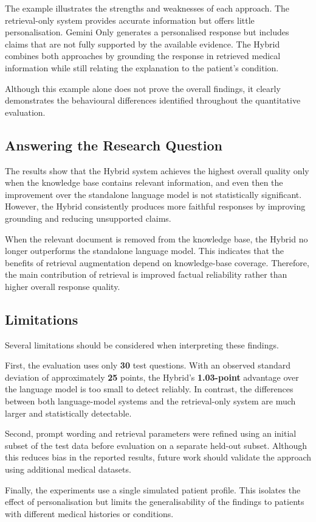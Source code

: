 The example illustrates the strengths and weaknesses of each approach. The retrieval-only system provides accurate information but offers little personalisation. Gemini Only generates a personalised response but includes claims that are not fully supported by the available evidence. The Hybrid combines both approaches by grounding the response in retrieved medical information while still relating the explanation to the patient's condition.

Although this example alone does not prove the overall findings, it clearly demonstrates the behavioural differences identified throughout the quantitative evaluation.

\subsection{Answering the Research Question}

The results show that the Hybrid system achieves the highest overall quality only when the knowledge base contains relevant information, and even then the improvement over the standalone language model is not statistically significant. However, the Hybrid consistently produces more faithful responses by improving grounding and reducing unsupported claims.

When the relevant document is removed from the knowledge base, the Hybrid no longer outperforms the standalone language model. This indicates that the benefits of retrieval augmentation depend on knowledge-base coverage. Therefore, the main contribution of retrieval is improved factual reliability rather than higher overall response quality.

\subsection{Limitations}

Several limitations should be considered when interpreting these findings.

First, the evaluation uses only \textbf{30} test questions. With an observed standard deviation of approximately \textbf{25} points, the Hybrid's \textbf{1.03-point} advantage over the language model is too small to detect reliably. In contrast, the differences between both language-model systems and the retrieval-only system are much larger and statistically detectable.

Second, prompt wording and retrieval parameters were refined using an initial subset of the test data before evaluation on a separate held-out subset. Although this reduces bias in the reported results, future work should validate the approach using additional medical datasets.

Finally, the experiments use a single simulated patient profile. This isolates the effect of personalisation but limits the generalisability of the findings to patients with different medical histories or conditions.
